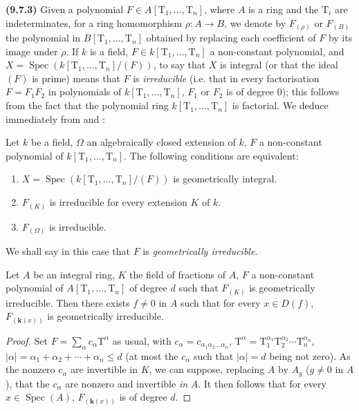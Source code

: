 \textbf{(9.7.3)}
\label{IV.9.7.3}
Given a polynomial $F\in A[\mathrm{T}_1,\ldots,\mathrm{T}_n]$, where $A$ is a ring and the $\mathrm{T}_i$ are indeterminates, for a ring homomorphism $\rho:A\to B$, we denote by $F_{(\rho)}$ or $F_{(B)}$ the polynomial in $B[\mathrm{T}_1,\ldots,\mathrm{T}_n]$ obtained by replacing each coefficient of $F$ by its image under $\rho$.
If $k$ is a field, $F\in k[\mathrm{T}_1,\ldots,\mathrm{T}_n]$ a non-constant polynomial, and $X=\operatorname{Spec}(k[\mathrm{T}_1,\ldots,\mathrm{T}_n]/(F))$, to say that $X$ is integral (or that the ideal $(F)$ is prime) means that $F$ is \emph{irreducible} (i.e. that in every factorisation $F=F_1 F_2$ in polynomials of $k[\mathrm{T}_1,\ldots,\mathrm{T}_n]$, $F_1$ or $F_2$ is of degree $0$); this follows from the fact that the polynomial ring $k[\mathrm{T}_1,\ldots,\mathrm{T}_n]$ is factorial.
We deduce immediately from  and :

\begin{lemma}[9.7.4]
\label{IV.9.7.4}
Let $k$ be a field, $\Omega$ an algebraically closed extension of $k$, $F$ a non-constant polynomial of $k[\mathrm{T}_1,\ldots,\mathrm{T}_n]$.
The following conditions are equivalent:
\begin{enumerate}[label=\emph{\alph*)}]
  \item $X=\operatorname{Spec}(k[\mathrm{T}_1,\ldots,\mathrm{T}_n]/(F))$ is geometrically integral.
  \item $F_{(K)}$ is irreducible for every extension $K$ of $k$.
  \item $F_{(\Omega)}$ is irreducible.
\end{enumerate}
We shall say in this case that $F$ is \emph{geometrically irreducible}.
\end{lemma}

\begin{lemma}[9.7.5]
\label{IV.9.7.5}
Let $A$ be an integral ring, $K$ the field of fractions of $A$, $F$ a non-constant polynomial of $A[\mathrm{T}_1,\ldots,\mathrm{T}_n]$ of degree $d$ such that $F_{(K)}$ is geometrically irreducible.
Then there exists $f\neq 0$ in $A$ such that for every $x\in D(f)$, $F_{(\boldsymbol{k}(x))}$ is geometrically irreducible.
\end{lemma}

\begin{proof}
Set $F=\sum_\alpha c_\alpha \mathrm{T}^\alpha$ as usual, with $c_\alpha=c_{\alpha_1\alpha_2\ldots\alpha_n}$, $\mathrm{T}^\alpha=\mathrm{T}_1^{\alpha_1}\mathrm{T}_2^{\alpha_2}\cdots\mathrm{T}_n^{\alpha_n}$, $|\alpha|=\alpha_1+\alpha_2+\cdots+\alpha_n\leqslant d$ (at most the $c_\alpha$ such that $|\alpha|=d$ being not zero).
As the nonzero $c_\alpha$ are invertible in $K$, we can suppose, replacing $A$ by $A_g$ ($g\neq 0$ in $A$), that the $c_\alpha$ are nonzero and invertible \emph{in} $A$.
It then follows that for every $x\in\operatorname{Spec}(A)$, $F_{(\boldsymbol{k}(x))}$ is of degree $d$.
\end{proof}

